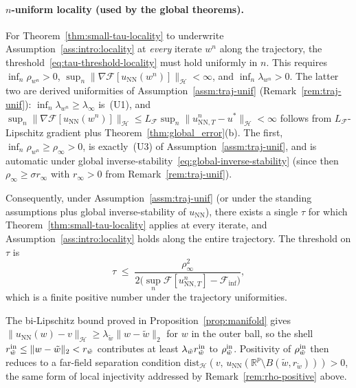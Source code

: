 \documentclass[twoside,11pt]{article}
\newcommand{\R}{\mathbb{R}}
\newcommand{\NN}{\mathrm{NN}}
\newcommand{\calF}{\mathcal{F}}
\newcommand{\calH}{\mathcal{H}}
\newcommand{\dist}{\mathrm{dist}}
\begin{document}
\begin{remark}
\paragraph{$n$-uniform locality (used by the global theorems).}
For Theorem~\ref{thm:small-tau-locality} to underwrite Assumption~\ref{ass:intro:locality} at \emph{every} iterate $w^n$ along the trajectory, the threshold~\eqref{eq:tau-threshold-locality} must hold uniformly in $n$. This requires $\inf_n\rho_{w^n}>0$, $\sup_n\|\nabla\calF[u_\NN(w^n)]\|_\calH<\infty$, and $\inf_n\lambda_{w^n}>0$. The latter two are derived uniformities of Assumption~\ref{assm:traj-unif} (Remark~\ref{rem:traj-unif}): $\inf_n\lambda_{w^n}\ge\lambda_\infty$ is~(U1), and $\sup_n\|\nabla\calF[u_\NN(w^n)]\|_\calH\le L_\calF\sup_n\|u^n_{\NN,T}-u^*\|_\calH<\infty$ follows from $L_\calF$-Lipschitz gradient plus Theorem~\ref{thm:global_error}(b). The first, $\inf_n\rho_{w^n}\ge\rho_\infty>0$, is exactly~(U3) of Assumption~\ref{assm:traj-unif}, and is automatic under global inverse-stability~\eqref{eq:global-inverse-stability} (since then $\rho_\infty\ge\sigma r_\infty$ with $r_\infty>0$ from Remark~\ref{rem:traj-unif}).

Consequently, under Assumption~\ref{assm:traj-unif} (or under the standing assumptions plus global inverse-stability of $u_\NN$), there exists a single $\tau$ for which Theorem~\ref{thm:small-tau-locality} applies at every iterate, and Assumption~\ref{ass:intro:locality} holds along the entire trajectory. The threshold on $\tau$ is
\[
\tau \;\le\; \frac{\rho_\infty^{2}}{2\bigl(\sup_n\calF[u^n_{\NN,T}]-\calF_{\inf}\bigr)},
\]
which is a finite positive number under the trajectory uniformities.
\end{remark}

\begin{remark}\label{rem:rho-in-strength}
The bi-Lipschitz bound proved in Proposition~\ref{prop:manifold} gives $\|u_\NN(w)-v\|_\calH \ge \lambda_{\tilde w}\|w-\tilde w\|_2$ for $w$ in the outer ball, so the shell $r^{\rm in}_{\tilde w}\le \|w-\tilde w\|_2 < r_{\tilde w}$ contributes at least $\lambda_{\tilde w} r^{\rm in}_{\tilde w}$ to $\rho^{\rm in}_{\tilde w}$. Positivity of $\rho^{\rm in}_{\tilde w}$ then reduces to a far-field separation condition $\dist_\calH(v,\,u_\NN(\R^p\setminus B(\tilde w,r_{\tilde w})))>0$, the same form of local injectivity addressed by Remark~\ref{rem:rho-positive} above.
\end{remark}
\end{document}
